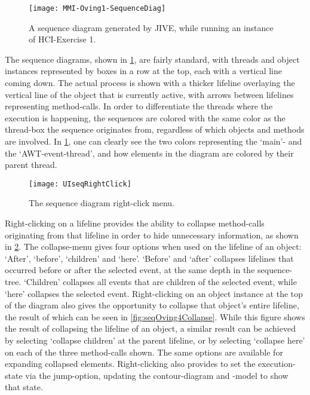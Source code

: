 \begin{figure}[H]
	\centering
	\texttt{[image: MMI-Oving1-SequenceDiag]}
	\caption{A sequence diagram generated by JIVE, while running an instance of HCI-Exercise 1.}
	\label{fig:seqOving1}
\end{figure}
The sequence diagrams, shown in \cref{fig:seqOving1}, are fairly standard, with threads and object instances represented by boxes in a row at the top, each with a vertical line coming down.
The actual process is shown with a thicker lifeline overlaying the vertical line of the object that is currently active, with arrows between lifelines representing method-calls.
In order to differentiate the threads where the execution is happening, the sequences are colored with the same color as the thread-box the sequence originates from, regardless of which objects and methods are involved.
In \cref{fig:seqOving1}, one can clearly see the two colors representing the `main'- and the `AWT-event-thread', and how elements in the diagram are colored by their parent thread.
\begin{figure}[H]
	\centering
	\texttt{[image: UIseqRightClick]}
	\caption{The sequence diagram right-click menu.}
	\label{fig:UIseqRightClick}
\end{figure}
Right-clicking on a lifeline provides the ability to collapse method-calls originating from that lifeline in order to hide unnecessary information, as shown in \cref{fig:UIseqRightClick}.
The collapse-menu gives four options when used on the lifeline of an object: `After', `before', `children' and `here'.
`Before' and `after' collapses lifelines that occurred before or after the selected event, at the same depth in the sequence-tree.
`Children' collapses all events that are children of the selected event, while `here' collapses the selected event.
Right-clicking on an object instance at the top of the diagram also gives the opportunity to collapse that object's entire lifeline, the result of which can be seen in \cref{fig:seqOving4Collapse}.
While this figure shows the result of collapsing the lifeline of an object, a similar result can be achieved by selecting `collapse children' at the parent lifeline, or by selecting `collapse here' on each of the three method-calls shown.
The same options are available for expanding collapsed elements.
Right-clicking also provides to set the execution-state via the jump-option, updating the contour-diagram and -model to show that state.


